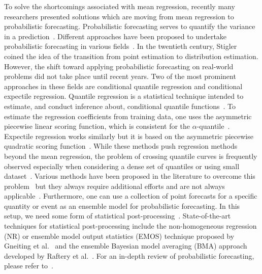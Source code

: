 \documentclass{ieeeaccess}
\begin{document}
To solve the shortcomings associated with mean regression, recently many researchers presented solutions which are moving from mean regression to probabilistic forecasting. Probabilistic forecasting serves to quantify the variance in a prediction~\cite{gneiting2014probabilistic}. Different approaches have been proposed to undertake probabilistic forecasting in various fields~\cite{collins2007ensembles, gneiting2005weather, palmer2002economic, palmer2012towards, cloke2009ensemble, krzysztofowicz2001case, jordan2011operational, pinson2013wind, zhu2012short, groen2013real, timmermann2000density, montgomery2012ensemble, alkema2007probabilistic, raftery2012bayesian, jones2012improved, hood2004systems}. In the twentieth century, Stigler~\cite{stigler1975transition} coined the idea of the transition from point estimation to distribution estimation. However, the shift toward applying probabilistic forecasting on real-world problems did not take place until recent years. Two of the most prominent approaches in these fields are conditional quantile regression and conditional expectile regression. Quantile regression is a statistical technique intended to estimate, and conduct inference about, conditional quantile functions~\cite{koenkerquantile}. To estimate the regression coefficients from training data, one uses the asymmetric piecewise linear scoring function, which is consistent for the $\alpha$-quantile~\cite{koenker1978regression,koenkerquantile}. Expectile regression works similarly but it is based on the asymmetric piecewise quadratic scoring function~\cite{efron1991regression,newey1987asymmetric,sobotka2012geoadditive}. While these methods push regression methods beyond the mean regression, the problem of crossing quantile curves is frequently observed especially when considering a dense set of quantiles or using small dataset~\cite{kneib2013beyond}. Various methods have been proposed in the literature to overcome this problem~\cite{dette2008non,schnabel2013simultaneous} but they always require additional efforts and are not always applicable~\cite{kneib2013beyond}. Furthermore, one can use a collection of point forecasts for a specific quantity or event as an ensemble model for probabilistic forecasting. In this setup, we need some form of statistical post-processing~\cite{gneiting2014probabilistic}. State-of-the-art techniques for statistical post-processing include the non-homogeneous regression (NR) or ensemble model output statistics (EMOS) technique proposed by Gneiting et al.~\cite{gneiting2005weather} and the ensemble Bayesian model averaging (BMA) approach developed by Raftery et al.~\cite{raftery2005using}. For an in-depth review of probabilistic forecasting, please refer to~\cite{gneiting2014probabilistic}.
\end{document}
